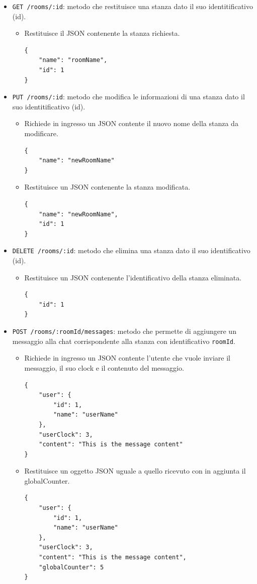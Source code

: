 \documentclass[a4paper]{article}
\begin{document}
\begin{itemize}
\begin{itemize}
\begin{verbatim}
    ...
]
        \end{verbatim}
    \end{itemize}
    \item \texttt{GET /rooms/:id}: metodo che restituisce una stanza dato il suo identitificativo (id).
    \begin{itemize}
        \item Restituisce il JSON contenente la stanza richiesta.
        \begin{verbatim}
{
    "name": "roomName",
    "id": 1
}
        \end{verbatim}
    \end{itemize}
    \item \texttt{PUT /rooms/:id}: metodo che modifica le informazioni di una stanza dato il suo identitificativo (id).
    \begin{itemize}
        \item Richiede in ingresso un JSON contente il nuovo nome della stanza da modificare.
        \begin{verbatim}
{
    "name": "newRoomName"
}
        \end{verbatim}
        \item Restituisce un JSON contenente la stanza modificata.
        \begin{verbatim}
{
    "name": "newRoomName",
    "id": 1
}
        \end{verbatim}
        \end{itemize}
    \item \texttt{DELETE /rooms/:id}: metodo che elimina una stanza dato il suo identificativo (id).
    \begin{itemize}
        \item Restituisce un JSON contenente l'identificativo della stanza eliminata.
        \begin{verbatim}
{
    "id": 1
}
        \end{verbatim}
    \end{itemize}
    \item \texttt{POST /rooms/:roomId/messages}: metodo che permette di aggiungere un messaggio alla chat corrispondente alla stanza con identificativo \texttt{roomId}.
    \begin{itemize}
        \item Richiede in ingresso un JSON contente l'utente che vuole inviare il messaggio, il suo clock e il contenuto del messaggio. 
        \newpage
        \begin{verbatim}
{
    "user": {
        "id": 1,
        "name": "userName"
    },
    "userClock": 3,
    "content": "This is the message content"
}
        \end{verbatim}
        \item Restituisce un oggetto JSON uguale a quello ricevuto con in aggiunta il globalCounter.
        \begin{verbatim}
{
    "user": {
        "id": 1,
        "name": "userName"
    },
    "userClock": 3,
    "content": "This is the message content",
    "globalCounter": 5
}
        \end{verbatim}
    \end{itemize}
    

\end{itemize}
\end{document}
